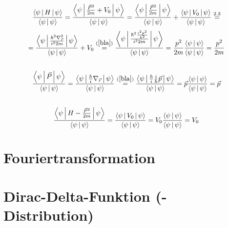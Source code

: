 \documentclass[a4paper,11pt]{article}
\begin{document}
\subsection{}
\begin{equation}
        \frac{\Braket{\psi|H|\psi}}{\Braket{\psi|\psi}} = \frac{\Braket{\psi|\frac{\vec{P}^2}{2m} + V_0|\psi}}{\Braket{\psi|\psi}} = \frac{\Braket{\psi|\frac{\vec{P}^2}{2m}|\psi}}{\Braket{\psi|\psi}} + \frac{\Braket{\psi|V_0|\psi}}{\Braket{\psi|\psi}} \overset{2.3}{=}
\end{equation}
\begin{equation}
        = \frac{\Braket{\psi|\frac{\hbar^2\nabla^2_{\vec{r}}}{i^22m}|\psi}}{\Braket{\psi|\psi}} + V_0 \overset{(\ref{bla})}{=} \frac{\Braket{\psi|\frac{\hbar^2\frac{i^2p^2}{\hbar^2}}{i^22m}|\psi}}{\Braket{\psi|\psi}} = \frac{p^2}{2m}\frac{\Braket{\psi|\psi}}{\Braket{\psi|\psi}} = \frac{p^2}{2m}
\end{equation}

\subsection{}
\begin{equation}
        \frac{\Braket{\psi|\vec{P}|\psi}}{\Braket{\psi|\psi}} = \frac{\Braket{\psi|\frac{\hbar}{i}\nabla_{\vec{r}}|\psi}}{\Braket{\psi|\psi}} \overset{(\ref{bla})}{=} \frac{\Braket{\psi|\frac{\hbar}{i}\frac{i}{\hbar}\vec{p}|\psi}}{\Braket{\psi|\psi}} = \vec{p}\frac{\Braket{\psi|\psi}}{\Braket{\psi|\psi}} = \vec{p}
\end{equation}

\subsection{}
\begin{equation}
        \frac{\Braket{\psi|H - \frac{\vec{P}^2}{2m}|\psi}}{\Braket{\psi|\psi}} = \frac{\Braket{\psi|V_0|\psi}}{\Braket{\psi|\psi}} = V_0\frac{\Braket{\psi|\psi}}{\Braket{\psi|\psi}} = V_0
\end{equation}

\section{Fouriertransformation}

\section{Dirac-Delta-Funktion (-Distribution)}
\end{document}
